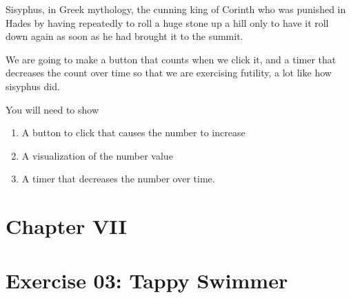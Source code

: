 \documentclass[12pt]{report}
\begin{document}
\vspace{\baselineskip}
Sisyphus, in Greek mythology, the cunning king of Corinth who was punished in Hades by having repeatedly to roll a huge stone up a hill only to have it roll down again as soon as he had brought it to the summit.\par


\vspace{\baselineskip}
We are going to make a button that counts when we click it, and a timer that decreases the count over time so that we are exercising futility, a lot like how sisyphus did.\par


\vspace{\baselineskip}
You will need to show\par

\begin{enumerate}
	\item A button to click that causes the number to increase\par

	\item A visualization of the number value\par

	\item A timer that decreases the number over time. 
\end{enumerate}\par


\vspace{\baselineskip}

\vspace{\baselineskip}



\newpage

\vspace{\baselineskip}
\vspace{\baselineskip}

\vspace{\baselineskip}
\section*{Chapter VII}
\section*{Exercise 03: Tappy Swimmer}
\end{document}
